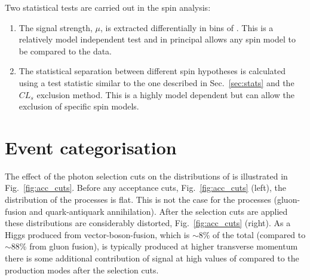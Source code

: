 Two statistical tests are carried out in the spin analysis:

\begin{enumerate}
  \item The signal strength, $\mu$, is extracted differentially in bins of \abscostheta. This is a relatively model independent test and in principal allows any spin model to be compared to the data.
  \item The statistical separation between different spin hypotheses is calculated using a test statistic similar to the one described in Sec.~\ref{sec:stats} and the $CL_{s}$ exclusion method. This is a highly model dependent but can allow the exclusion of specific spin models.
\end{enumerate}

\section{Event categorisation}
\label{sec:spin_cats}

The effect of the photon selection cuts on the distributions of 
\abscostheta is illustrated in Fig.~\ref{fig:acc_cuts}. Before any acceptance cuts, Fig.~\ref{fig:acc_cuts} (left), the \abscostheta
distribution of the \zerop processes is flat. This is not the case for the \twomp processes (gluon-fusion and quark-antiquark annihilation). After the selection cuts are applied these distributions are considerably distorted, Fig.~\ref{fig:acc_cuts} (right). As a Higgs produced from vector-boson-fusion, which is $\sim$8\% of the total (compared to $\sim$88\% from gluon fusion),  is typically produced at higher transverse momentum there is some additional contribution of \zerop signal at high values of \abscostheta compared to the \twomp production modes after the selection cuts.

